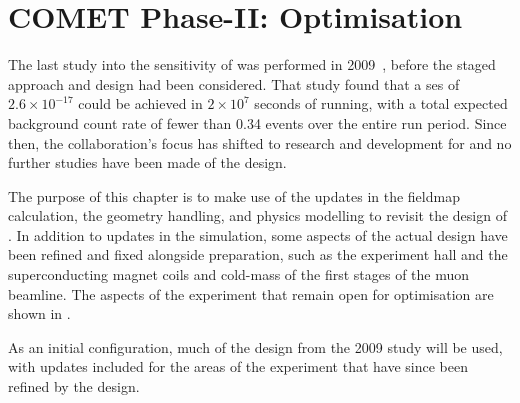 
\chapter{COMET Phase-II: Optimisation}
The last study into the sensitivity of \COMET \phaseII was performed in 2009~\cite{CDRphase2}, before the staged approach and \phaseI design had been considered.
That study found that a \ac{ses} of $2.6\times10^{-17}$ could be achieved in $2\times10^{7}$ seconds of running, with a total expected background count rate of fewer than 0.34 events over the entire run period.
Since then, the collaboration's focus has shifted to research and development for \phaseI and no further studies have been made of the \phaseII design.

The purpose of this chapter is to make use of the updates in the fieldmap calculation, the geometry handling, and physics modelling to revisit the design of \phaseII.
In addition to updates in the simulation, some aspects of the actual design have been refined and fixed alongside \phaseI preparation, such as the experiment hall and the superconducting magnet coils and cold-mass of the first stages of the muon beamline.
The aspects of the experiment that remain open for optimisation are shown in .

As an initial configuration, much of the design from the 2009 study will be used, with updates included for the areas of the experiment that have since been refined by the \phaseI design.
\TabOptimisationParameters%

